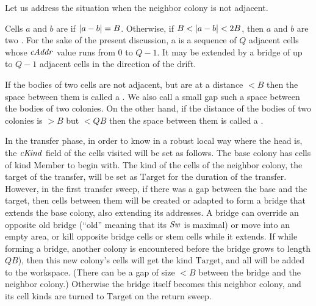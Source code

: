 \documentclass[12pt]{memoir}
\newcommand{\fld}[1]{\ensuremath{\textit{#1\/}}}
\newcommand{\rul}[1]{\ensuremath{\texttt{\slshape #1\/}}}
\def\B{B}
\newcommand{\cAddr}{\fld{cAddr}}
\newcommand{\cDrift}{\fld{cDrift}}
\newcommand{\cKind}{\fld{cKind}}
\newcommand{\Sweep}{\fld{Sw}}
\newcommand{\cSweep}{\fld{cSw}}
\newcommand{\Last}{\mathrm{Last}}
\newcommand{\Member}{\mathrm{Member}}
\newcommand{\Target}{\mathrm{Target}}
\newcommand{\Alarm}{\rul{Alarm}}
\begin{document}
Let us address the situation when the neighbor colony is not adjacent.

\begin{definition}\label{def:adjacent}
  Cells \( a \) and \( b \) are  if \( \abs{a-b}=\B \).
  Otherwise, if \( \B < \abs{a- b} < 2\B \), then
  \( a \) and \( b \) are two .
For the sake of the present discussion, a  is a sequence of \( Q \) adjacent
cells whose \( \cAddr \) value runs from \( 0 \) to \( Q-1 \).
It may be extended by a bridge of up to \( Q-1 \) adjacent cells in the direction of the drift.

If the bodies of two cells are not adjacent, but are at a distance \( <\B \) then the space
between them is called a .
We also call a small gap such a space between the bodies of two colonies.
On the other hand, if the distance of the bodies of two colonies is \( >\B \) 
but \( <Q\B \) then the space between them is called a .
\end{definition}

In the transfer phase, in order to know in a robust local way where the head is,
the \( \cKind \) field of the cells visited will be set as follows.
The base colony has cells of kind \( \Member \) to begin with.
The kind of the cells of the neighbor colony, the target of the transfer, will be set
as \( \Target \) for the duration of the transfer.
However, in the first transfer sweep, if there was a gap between the base and
the target, then cells between them will be created or adapted to form
a bridge that extends the base colony, also extending its addresses.
A bridge can override an opposite old bridge (``old'' meaning 
that its \( \Sweep \) is maximal) or move 
into an empty area, or kill opposite bridge cells or stem cells while it extends.
If while forming a bridge, another colony is encountered before
the bridge grows to length \( Q\B \)), then this new colony's cells will get the 
kind \( \Target \), and all will be added to the workspace.
(There can be a gap of size \( <\B \) between the bridge and the neighbor colony.)
Otherwise the bridge itself becomes this neighbor colony, and its cell kinds are
turned to \( \Target \) on the return sweep.


\end{document}
